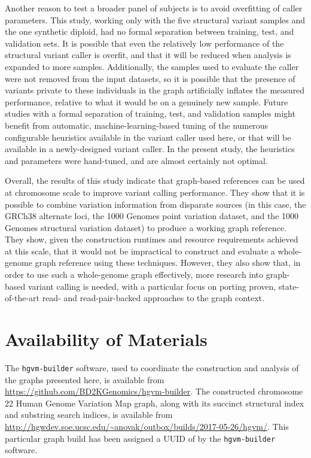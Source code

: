 Another reason to test a broader panel of subjects is to avoid overfitting of caller parameters. This study, working only with the five structural variant samples and the one synthetic diploid, had no formal separation between training, test, and validation sets. It is possible that even the relatively low performance of the structural variant caller is overfit, and that it will be reduced when analysis is expanded to more samples. Additionally, the samples used to evaluate the caller were not removed from the input datasets, so it is possible that the presence of variants private to these individuals in the graph artificially inflates the measured performance, relative to what it would be on a genuinely new sample. Future studies with a formal separation of training, test, and validation samples might benefit from automatic, machine-learning-based tuning of the numerous configurable heuristics available in the variant caller used here, or that will be available in a newly-designed variant caller. In the present study, the heuristics and parameters were hand-tuned, and are almost certainly not optimal.

Overall, the results of this study indicate that graph-based references can be used at chromosome scale to improve variant calling performance. They show that it is possible to combine variation information from disparate sources (in this case, the GRCh38 alternate loci, the 1000 Genomes point variation dataset, and the 1000 Genomes structural variation dataset) to produce a working graph reference. They show, given the construction runtimes and resource requirements achieved at this scale, that it would not be impractical to construct and evaluate a whole-genome graph reference using these techniques. However, they also show that, in order to use such a whole-genome graph effectively, more research into graph-based variant calling is needed, with a particular focus on porting proven, state-of-the-art read- and read-pair-backed approaches to the graph context.


\section{Availability of Materials}

\begin{sloppypar}
The \texttt{hgvm-builder} software, used to coordinate the construction and analysis of the graphs presented here, is available from \url{https://github.com/BD2KGenomics/hgvm-builder}. The constructed chromosome 22 Human Genome Variation Map graph, along with its succinct structural index and substring search indices, is available from \url{http://hgwdev.soe.ucsc.edu/~anovak/outbox/builds/2017-05-26/hgvm/}. This particular graph build has been assigned a UUID of  by the \texttt{hgvm-builder} software.
\end{sloppypar}

